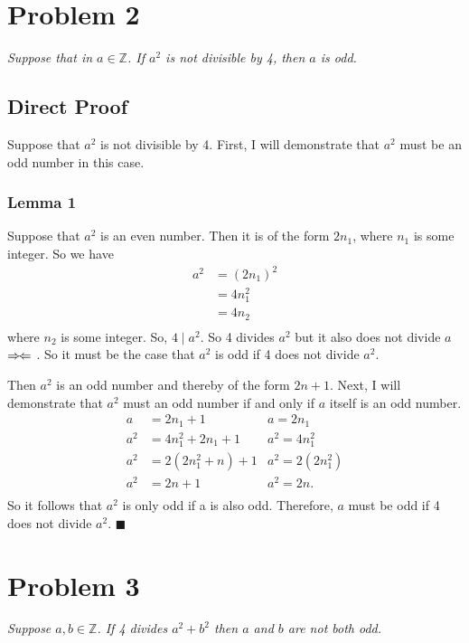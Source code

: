 \documentclass{article}
\newcommand*{\QEDA}{\hfill\ensuremath{\blacksquare}}%
\newcommand{\contradiction}{%
  \ensuremath{{\Rightarrow\mspace{-2mu}\Leftarrow}}%
}
\begin{document}
	\section{Problem 2} \textit{Suppose that in $ a \in  \mathbb{Z}$. If $a^2$ is not divisible by 4, then $a$ is odd.}
	
		\subsection{Direct Proof} Suppose that $a^2$ is not divisible by 4. First, I will demonstrate that $a^2$ must be an odd number in this case. 
		\subsubsection{Lemma 1} Suppose that $a^2$ is an even number. Then it is of the form $2n_1$, where $n_1$ is some integer. So we have
		\begin{align*}
		a^2 &= (2n_1)^2\\
		&= 4n_1^2\\
		&= 4n_2\\
		\end{align*}
		where $n_2$ is some integer. So, $4 \mid a^2$. So 4 divides $a^2$ but it also does not divide $a$ \contradiction. So it must be the case that $a^2$ is odd if 4 does not divide $a^2$.
		
		Then $a^2$ is an odd number and thereby of the form $2n + 1$. Next, I will demonstrate that $a^2$ must an odd number if and only if $a$ itself is an odd number.
		\begin{align*}
		a &= 2n_1 + 1     & a = 2n_1\\
		a^2 &= 4n_1^2 + 2n_1 + 1     & a^2 = 4n_1^2\\
		a^2 &= 2(2n_1^2 + n) + 1     & a^2 = 2(2n_1^2)\\
		a^2 &= 2n + 1     & a^2 = 2n.\\
		\end{align*}
		So it follows that $a^2$ is only odd if a is also odd. Therefore, $a$ must be odd if 4 does not divide $a^2$. \QEDA
	\section{Problem 3} \textit{Suppose $a, b \in \mathbb{Z}$. If 4 divides $a^2 + b^2$ then $a$ and $b$ are not both odd.}
\end{document}
